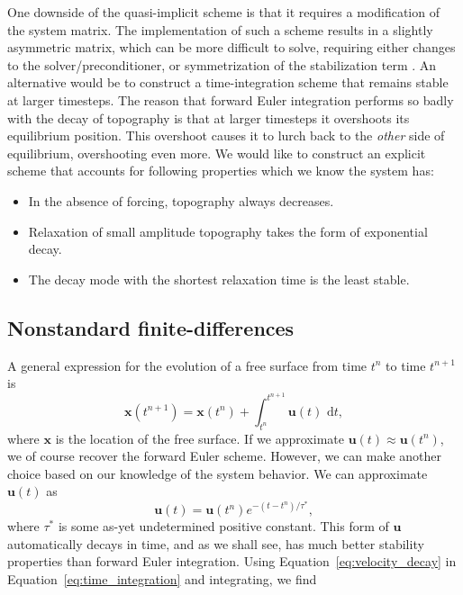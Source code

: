 \documentclass[preprint,12pt,authoryear]{elsarticle}
\begin{document}
One downside of the quasi-implicit scheme is that it requires a modification of the system matrix.
The implementation of such a scheme results in a slightly 
asymmetric matrix, which can be more difficult to solve, requiring either
changes to the solver/preconditioner, or symmetrization of the stabilization term \citep{kaus2010stabilization}.
An alternative would be to construct a time-integration scheme that remains stable at larger timesteps.
The reason that forward Euler integration performs so badly with the decay of topography is that 
at larger timesteps it overshoots its equilibrium position. This overshoot causes it to lurch back 
to the \emph{other} side of equilibrium, overshooting even more.
We would like to construct an explicit scheme that accounts for following properties which we know the system has:
\begin{itemize}
\item In the absence of forcing, topography always decreases.
\item Relaxation of small amplitude topography takes the form of exponential decay.
\item The decay mode with the shortest relaxation time is the least stable.
\end{itemize}

\subsection{Nonstandard finite-differences}

A general expression for the evolution of a free surface from time $t^n$ to time $t^{n+1}$ is 
\begin{equation}
\mathbf{x}(t^{n+1}) = \mathbf{x}(t^n) + \int_{t^{n}}^{t^{n+1}} \mathbf{u}(t) \text{ d}t,
\label{eq:time_integration}
\end{equation}
where $\mathbf{x}$ is the location of the free surface.  If we approximate $\mathbf{u}(t) \approx \mathbf{u}(t^{n})$, 
we of course recover the forward Euler scheme.
However, we can make another choice based on our knowledge of the system behavior. 
We can approximate $\mathbf{u}(t)$ as
\begin{equation}
\mathbf{u}(t) = \mathbf{u}(t^n) e^{-(t-t^n)/\tau^*},
\label{eq:velocity_decay}
\end{equation}
where $\tau^*$ is some as-yet undetermined positive constant.
This form of $\mathbf{u}$ automatically decays in time, and as we shall see, has much better 
stability properties than forward Euler integration.
Using Equation~\eqref{eq:velocity_decay} in Equation~\eqref{eq:time_integration} and integrating, we find
\end{document}
